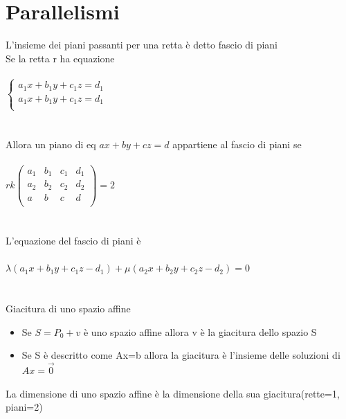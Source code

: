 \documentclass{article}
\begin{document}
\section{Parallelismi}
L'insieme dei piani passanti per una retta è detto fascio di piani\\
Se la retta r ha equazione\\\\
\(
\begin{cases}
    a_1x+b_1y+c_1z=d_1\\
    a_1x+b_1y+c_1z=d_1\\
\end{cases}
\)\\\\\\
Allora un piano di eq \(ax+by+cz=d\) appartiene al fascio di piani se\\\\
\(rk\left(
\begin{array}{cccc}
    a_1 & b_1 & c_1 & d_1\\
    a_2 & b_2 & c_2 & d_2\\
    a & b & c & d\\
\end{array}
\right)=2\)\\\\\\
L'equazione del fascio di piani è\\\\
\(\lambda(a_1x+b_1y+c_1z-d_1)+\mu(a_2x+b_2y+c_2z-d_2)=0\)\\\\\\
{\large Giacitura di uno spazio affine}
\begin{itemize}
    \item Se \(S=P_0+v\) è uno spazio affine allora v è la giacitura dello spazio S
    \item Se S è descritto come Ax=b allora la giacitura è l'insieme delle soluzioni di \(Ax=\vec{0}\)
\end{itemize}
La dimensione di uno spazio affine è la dimensione della sua giacitura(rette=1, piani=2)\\\\\\\\\\\\\\\\\\\\\\\\\\\\
\end{document}
